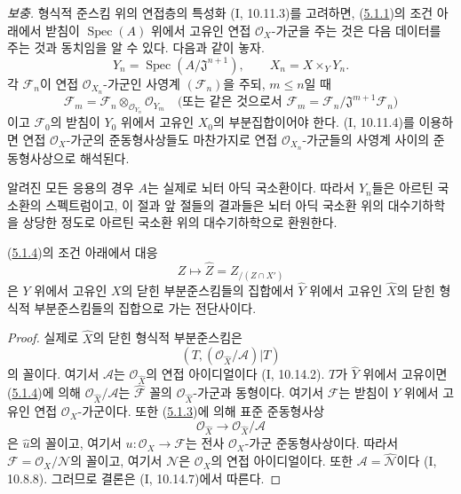 \begin{env}[5.1.7]
\label{III.5.1.7-fr}
\emph{보충.}
형식적 준스킴 위의 연접층의 특성화 (I, 10.11.3)를 고려하면,
(\hyperref[III.5.1.1-fr]{5.1.1})의 조건 아래에서 받침이
$\operatorname{Spec}(A)$ 위에서 고유인 연접
$\mathcal O_X$-가군을 주는 것은 다음 데이터를 주는 것과 동치임을
알 수 있다. 다음과 같이 놓자.
\[
Y_n=\operatorname{Spec}(A/\mathfrak J^{n+1}),\qquad
X_n=X\times_Y Y_n.
\]
각 $\mathcal F_n$이 연접 $\mathcal O_{X_n}$-가군인 사영계
$(\mathcal F_n)$을 주되, $m\leq n$일 때
\[
\mathcal F_m
=\mathcal F_n\otimes_{\mathcal O_{Y_n}}\mathcal O_{Y_m}
\quad\text{(또는 같은 것으로서 }\mathcal F_m
=\mathcal F_n/\mathfrak J^{m+1}\mathcal F_n\text{)}
\]
이고 $\mathcal F_0$의 받침이 $Y_0$ 위에서 고유인 $X_0$의
부분집합이어야 한다. (I, 10.11.4)를 이용하면 연접
$\mathcal O_X$-가군의 준동형사상들도 마찬가지로 연접
$\mathcal O_{X_n}$-가군들의 사영계 사이의 준동형사상으로
해석된다.


알려진 모든 응용의 경우 $A$는 실제로 뇌터 아딕 국소환이다.
따라서 $Y_n$들은 아르틴 국소환의 스펙트럼이고, 이 절과 앞 절들의
결과들은 뇌터 아딕 국소환 위의 대수기하학을 상당한 정도로 아르틴
국소환 위의 대수기하학으로 환원한다.
\end{env}

\begin{corollary}[5.1.8]
\label{III.5.1.8-fr}
(\hyperref[III.5.1.4-fr]{5.1.4})의 조건 아래에서 대응
\[
Z\longmapsto\widehat Z=Z_{/(Z\cap X')}
\]
은 $Y$ 위에서 고유인 $X$의 닫힌 부분준스킴들의 집합에서
$\widehat Y$ 위에서 고유인 $\widehat X$의 닫힌 형식적
부분준스킴들의 집합으로 가는 전단사이다.
\end{corollary}

\begin{proof}
실제로 $\widehat X$의 닫힌 형식적 부분준스킴은
\[
(T,(\mathcal O_{\widehat X}/\mathcal A)|T)
\]
의 꼴이다. 여기서 $\mathcal A$는 $\mathcal O_{\widehat X}$의 연접
아이디얼이다 (I, 10.14.2). $T$가 $\widehat Y$ 위에서 고유이면
(\hyperref[III.5.1.4-fr]{5.1.4})에 의해
$\mathcal O_{\widehat X}/\mathcal A$는
$\widehat{\mathcal F}$ 꼴의 $\mathcal O_{\widehat X}$-가군과
동형이다. 여기서 $\mathcal F$는 받침이 $Y$ 위에서 고유인 연접
$\mathcal O_X$-가군이다. 또한
(\hyperref[III.5.1.3-fr]{5.1.3})에 의해 표준 준동형사상
\[
\mathcal O_{\widehat X}\longrightarrow
\mathcal O_{\widehat X}/\mathcal A
\]
은 $\widehat u$의 꼴이고, 여기서
$u:\mathcal O_X\to\mathcal F$는 전사
$\mathcal O_X$-가군 준동형사상이다. 따라서
$\mathcal F=\mathcal O_X/\mathcal N$의 꼴이고, 여기서
$\mathcal N$은 $\mathcal O_X$의 연접 아이디얼이다. 또한
$\mathcal A=\widehat{\mathcal N}$이다 (I, 10.8.8).
그러므로 결론은 (I, 10.14.7)에서 따른다.
\end{proof}

